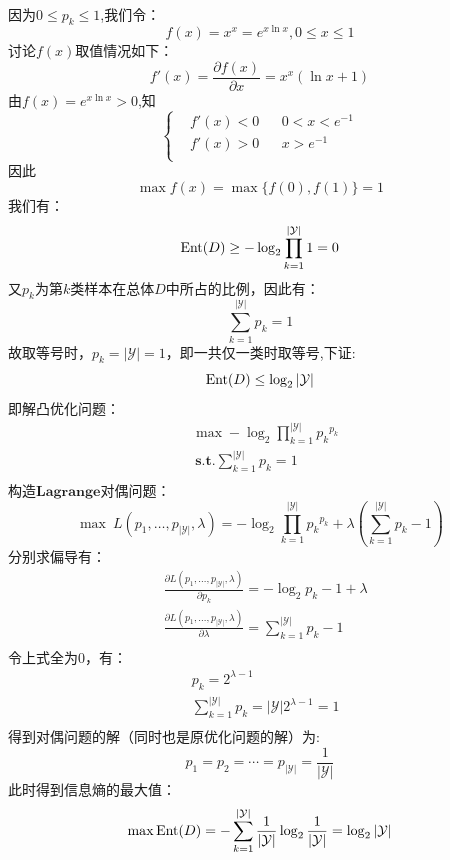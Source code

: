 \documentclass[answers]{exam}  %
\begin{document}
\begin{questions}
\begin{solution}
$$\begin{aligned}
        \end{aligned}$$
        因为$0\le p_k\le 1$,我们令：
        $$f(x)=x^x=e^{x\ln x},0\le x\le 1$$
        讨论$f(x)$取值情况如下：
        $$f'(x)=\frac{\partial f(x)}{\partial x}=x^x(\ln x + 1)$$
        由$f(x)=e^{x\ln x}>0$,知
        $$
            \left\{\begin{aligned}
                &f'(x)<0&&0<x<e^{-1}\\
                &f'(x)>0&&x>e^{-1}\\
            \end{aligned}\right.
        $$
        因此
        $$
                \max f(x)=\max\{f(0), f(1)\}= 1
        $$
        我们有：
        $$\operatornamewithlimits{Ent}(D)\ge -\log_2\prod^{|\mathcal Y|}_{k=1}1=0$$
        又$p_k$为第$k$类样本在总体$D$中所占的比例，因此有：
        $$\sum^{|\mathcal Y|}_{k=1}p_k=1$$
        故取等号时，$p_k=|\mathcal Y|=1$，即一共仅一类时取等号,下证:
        $$\operatornamewithlimits{Ent}(D)\le\log_2|\mathcal Y|$$
        即解凸优化问题：
        $$\begin{aligned}
            &\max -\log_2\prod_{k=1}^{|\mathcal Y|}{p_k}^{p_k}\\
            &\mathbf{\ s.t.}\sum^{|\mathcal Y|}_{k=1}p_k=1\\
        \end{aligned}$$
        构造$\mathbf{Lagrange}$对偶问题：
        $$\max\ L(p_1,\dots,p_{|\mathcal Y|},\lambda)=-\log_2\prod_{k=1}^{|\mathcal Y|}{p_k}^{p_k}+\lambda\left(\sum^{|\mathcal Y|}_{k=1}p_k-1 \right)$$
        分别求偏导有：
        $$\begin{aligned}
            &\frac{\partial L(p_1,\dots,p_{|\mathcal Y|},\lambda)}{\partial p_k}=-\log_2p_k-1+\lambda\\
            &\frac{\partial L(p_1,\dots,p_{|\mathcal Y|},\lambda)}{\partial \lambda}=\sum^{|\mathcal Y|}_{k=1}p_k-1\\
        \end{aligned}$$
        令上式全为0，有：
        $$\begin{aligned} 
            &p_k=2^{\lambda-1}\\
            &\sum^{|\mathcal Y|}_{k=1}p_k=|\mathcal Y|2^{\lambda-1}=1\\
        \end{aligned}$$
        得到对偶问题的解（同时也是原优化问题的解）为:
        $$p_1=p_2=\cdots=p_{|\mathcal Y|}=\frac1{|\mathcal Y|}$$
        此时得到信息熵的最大值：
        $$
        \max \operatornamewithlimits{Ent}(D)=-\sum^{|\mathcal Y|}_{k=1}\frac1{|\mathcal Y|}\log_2{\frac1{|\mathcal Y|}}=\log_2{|\mathcal Y|}
$$
\end{solution}
\end{questions}
\end{document}
